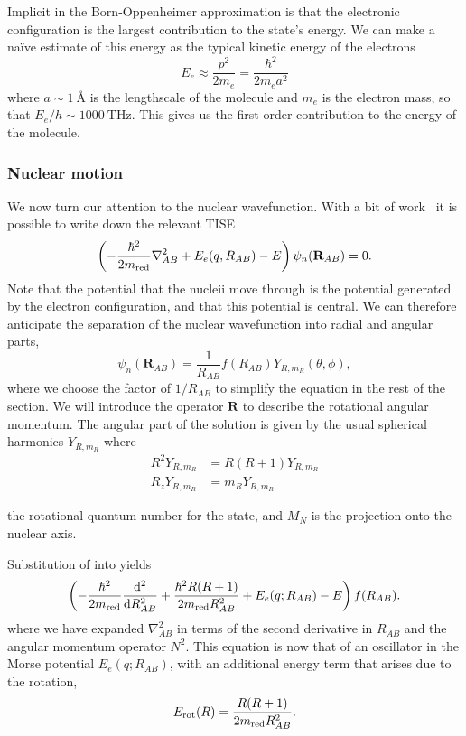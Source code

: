 Implicit in the Born-Oppenheimer approximation is that the electronic
configuration is the largest contribution to the state's energy. We can make a
na\"ive estimate of this energy as the typical kinetic energy of the electrons
%
\begin{equation}
  E_e \approx \frac{p^2}{2m_e} = \frac{\hbar^2}{2m_e a^2}
\end{equation}
%
where $a\sim\SI{1}{\angstrom}$ is the lengthscale of the molecule and $m_e$ is
the electron mass, so that $E_e/h \sim \SI{1000}{\tera\hertz}$. This
gives us the first order contribution to the energy of the molecule. 

\subsubsection{Nuclear motion}

We now turn our attention to the nuclear wavefunction. With a bit of
work~\cite{brown_carrington_2003} it is possible to write down the relevant
TISE
%
\begin{equation}
  \left(-\frac{\hbar^2}{2m_\text{red}{}}\nabla_{AB}^2 + E_e(q, R_{AB}) -
  E\right)\psi_n(\mathbf{R}_{AB}) = 0.
  \label{theory:eqn:nucTISE}
\end{equation}
%
Note that the potential that the nucleii move through is the potential
generated by the electron configuration, and that this potential is central. We
can therefore anticipate the separation of the nuclear wavefunction into radial
and angular parts,
%
\begin{equation}
  \psi_n(\mathbf{R}_{AB}) = \frac{1}{R_{AB}}f(R_{AB})Y_{R, m_R}(\theta, \phi),
  \label{theory:eqn:nucsep}
\end{equation}
%
where we choose the factor of $1/R_{AB}$ to simplify the equation in the rest
of the section. We will introduce the operator $\mathbf{R}$ to describe the
rotational angular momentum. The angular part of the solution is given by the usual
spherical harmonics $Y_{R, m_R}$ where
%
\begin{align}
  R^2 Y_{R, m_R} &= R(R+1) Y_{R, m_R} \\
  R_z Y_{R, m_R} &= m_R Y_{R, m_R}
\end{align}

the rotational quantum number for
the state, and $M_N$ is the projection onto the nuclear axis.

Substitution of  into 
yields 
%
\begin{equation}
  \left(-\frac{\hbar^2}{2m_\text{red}{}}\frac{\dd^2}{\dd R_{AB}^2} +
    \frac{\hbar^2 R(R+1)}{2m_\text{red}{}R_{AB}^2} + E_e(q; R_{AB}) - E\right)f(R_{AB}).
\end{equation}
%
where we have expanded $\nabla_{AB}^2$ in terms of the second derivative in
$R_{AB}$ and the angular momentum operator $N^2$. This equation is now that of
an oscillator in the Morse potential $E_e(q; R_{AB})$, with an additional
energy term that arises due to the rotation,
%
\begin{equation}
  E_\text{rot}(R) = \frac{R(R+1)}{2m_\text{red}{} R_{AB}^2}.
  \label{theory:eqn:rotenergy}
\end{equation}

